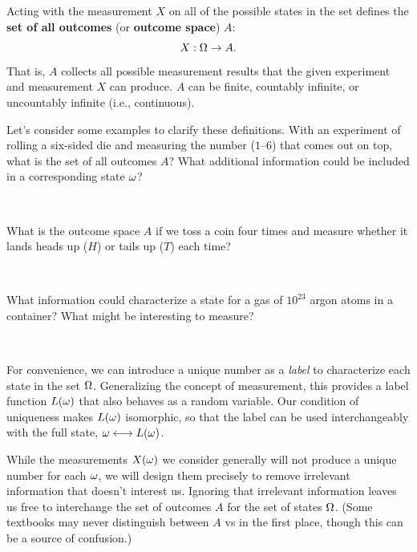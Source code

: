 Acting with the measurement $X$ on all of the possible states in the set \Om defines the \textbf{set of all outcomes} (or \textbf{outcome space}) $A$:
\begin{equation*}
  X: \Omega \to A.
\end{equation*}
That is, $A$ collects all possible measurement results that the given experiment \cE and measurement $X$ can produce.
$A$ can be finite, countably infinite, or uncountably infinite (i.e., continuous).

Let's consider some examples to clarify these definitions.
With an experiment of rolling a six-sided die and measuring the number ($1$--$6$) that comes out on top, what is the set of all outcomes $A$?
What additional information could be included in a corresponding state $\omega$?
\begin{mdframed}
  \ \\[75 pt] %
\end{mdframed}
What is the outcome space $A$ if we toss a coin four times and measure whether it lands heads up ($H$) or tails up ($T$) each time? %
\begin{mdframed}
  \ \\[75 pt] %
\end{mdframed}
What information could characterize a state \om for a gas of $10^{23}$ argon atoms in a container?
What might be interesting to measure?
\begin{mdframed}
  \ \\[95 pt] %
\end{mdframed}

For convenience, we can introduce a unique number as a \textit{label} to characterize each state \om in the set $\Omega$. %
Generalizing the concept of measurement, this provides a label function $L(\omega)$ that also behaves as a random variable.
Our condition of uniqueness makes $L(\omega)$ isomorphic, so that the label can be used interchangeably with the full state, $\omega \longleftrightarrow L(\omega)$.

While the measurements $X(\omega)$ we consider generally will not produce a unique number for each $\omega$, we will design them precisely to remove irrelevant information that doesn't interest us.
Ignoring that irrelevant information leaves us free to interchange the set of outcomes $A$ for the set of states $\Omega$.
(Some textbooks may never distinguish between $A$ vs \Om in the first place, though this can be a source of confusion.)

